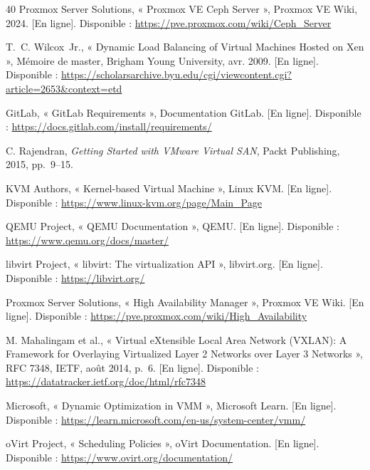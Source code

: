 \begin{thebibliography}{40}
 Proxmox Server Solutions, « Proxmox VE Ceph Server », Proxmox VE Wiki, 2024. [En ligne]. Disponible : \url{https://pve.proxmox.com/wiki/Ceph_Server}

 T.~C. Wilcox~Jr., « Dynamic Load Balancing of Virtual Machines Hosted on Xen », Mémoire de master, Brigham Young University, avr. 2009. [En ligne]. Disponible : \url{https://scholarsarchive.byu.edu/cgi/viewcontent.cgi?article=2653&context=etd}

 GitLab, « GitLab Requirements », Documentation GitLab. [En ligne]. Disponible : \url{https://docs.gitlab.com/install/requirements/}

 C. Rajendran, \textit{Getting Started with VMware Virtual SAN}, Packt Publishing, 2015, pp.~9--15.


KVM Authors, « Kernel-based Virtual Machine », Linux KVM. [En ligne]. Disponible : \url{https://www.linux-kvm.org/page/Main_Page}

QEMU Project, « QEMU Documentation », QEMU. [En ligne]. Disponible : \url{https://www.qemu.org/docs/master/}

libvirt Project, « libvirt: The virtualization API », libvirt.org. [En ligne]. Disponible : \url{https://libvirt.org/}

Proxmox Server Solutions, « High Availability Manager », Proxmox VE Wiki. [En ligne]. Disponible : \url{https://pve.proxmox.com/wiki/High_Availability}

 M. Mahalingam et al., « Virtual eXtensible Local Area Network (VXLAN): A Framework for Overlaying Virtualized Layer 2 Networks over Layer 3 Networks », RFC 7348, IETF, août 2014, p.~6. [En ligne]. Disponible : \url{https://datatracker.ietf.org/doc/html/rfc7348}

Microsoft, « Dynamic Optimization in VMM », Microsoft Learn. [En ligne]. Disponible : \url{https://learn.microsoft.com/en-us/system-center/vmm/}

oVirt Project, « Scheduling Policies », oVirt Documentation. [En ligne]. Disponible : \url{https://www.ovirt.org/documentation/}


\end{thebibliography}
